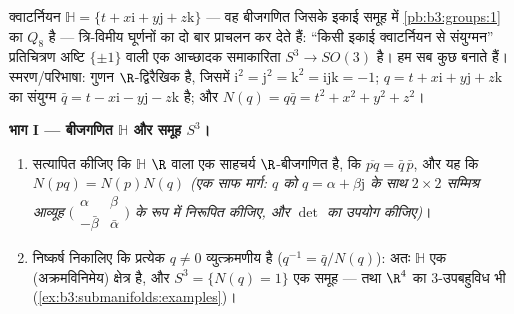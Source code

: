\begin{problem}\label{pb:b3:submanifolds:1}
क्वाटर्नियन $\mathbb H = \{t + x\mathrm i + y\mathrm j +
z\mathrm k\}$ --- वह बीजगणित जिसके इकाई समूह में \cref{pb:b3:groups:1} का
$Q_8$ है --- त्रि-विमीय घूर्णनों का दो बार प्राचलन कर देते हैं:
``किसी इकाई क्वाटर्नियन से संयुग्मन'' प्रतिचित्रण अष्टि $\{\pm1\}$
वाली एक आच्छादक समाकारिता $S^3 \to
SO(3)$ है। हम सब कुछ बनाते हैं।
स्मरण/परिभाषा: गुणन $\R$-द्विरैखिक है, जिसमें $\mathrm i^2 = \mathrm j^2 = \mathrm k^2 =
\mathrm{ijk} = -1$; $q = t + x\mathrm i +
y\mathrm j + z\mathrm k$ का
संयुग्म $\bar q = t - x\mathrm i -
y\mathrm j - z\mathrm k$ है; और $N(q) = q\bar q = t^2 + x^2 + y^2
+ z^2$।

\medskip
\noindent\textbf{भाग I --- बीजगणित $\mathbb H$ और समूह $S^3$।}
\begin{enumerate}
  \item सत्यापित कीजिए कि $\mathbb H$  $\R$ वाला एक साहचर्य
        $\R$-बीजगणित है, कि $\overline{pq} =
        \bar q\,\bar p$, और यह कि $N(pq) = N(p)N(q)$ \emph{(एक साफ
        मार्ग: $q$ को $q =
        \alpha + \beta\mathrm j$ के साथ $2\times2$ सम्मिश्र आव्यूह $\bigl(\begin{smallmatrix}\alpha & \beta\\
        -\bar\beta & \bar\alpha\end{smallmatrix}\bigr)$
        के रूप में निरूपित कीजिए, और $\det$ का उपयोग कीजिए)}।
  \item निष्कर्ष निकालिए कि प्रत्येक $q \neq 0$ व्युत्क्रमणीय है
        ($q^{-1} =
        \bar q/N(q)$): अतः $\mathbb H$ एक (अक्रमविनिमेय) क्षेत्र है, और
        $S^3 = \{N(q) = 1\}$ एक समूह --- तथा $\R^4$ का  $3$-उपबहुविध भी
        (\cref{ex:b3:submanifolds:examples})।
\end{enumerate}


\end{problem}
